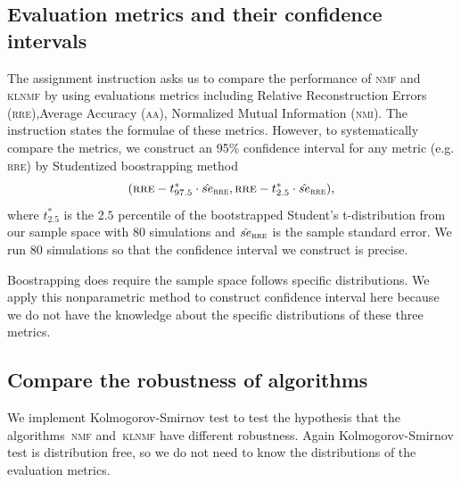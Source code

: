 \subsection{Evaluation metrics and their confidence intervals \label{ci}}
The assignment instruction asks us to compare the performance of \textsc{nmf} and \textsc{klnmf} by using evaluations metrics including Relative Reconstruction Errors (\textsc{rre}),Average Accuracy (\textsc{aa}), Normalized Mutual Information (\textsc{nmi}). The instruction states the formulae of these metrics. However, to systematically compare the metrics, we construct an 95\% confidence interval for any metric (e.g. \textsc{rre}) by Studentized boostrapping method
\begin{equation}
(\textsc{rre} -t_{97.5}^{*}\cdot {\hat {se}}_{\textsc{rre} },\textsc{rre} -t_{2.5}^{*}\cdot {\hat {se}}_{\textsc{rre}}), \label{eq:boot}
\end{equation}
where $t^*_{2.5}$ is the $2.5$ percentile of the bootstrapped Student's t-distribution from our sample space with 80 simulations and $\hat{se}_{\textsc{rre}}$ is the sample standard error. We run 80 simulations so that the confidence interval we construct is precise.

Boostrapping does require the sample space follows specific distributions. We apply this nonparametric method to construct confidence interval here because we do not have the knowledge about the specific distributions of these three metrics.

\subsection{Compare the robustness of algorithms}
We implement Kolmogorov-Smirnov test to test the hypothesis that the algorithms~\textsc{nmf} and~\textsc{klnmf} have different robustness. Again Kolmogorov-Smirnov test is distribution free, so we do not need to know the distributions of the evaluation metrics.

